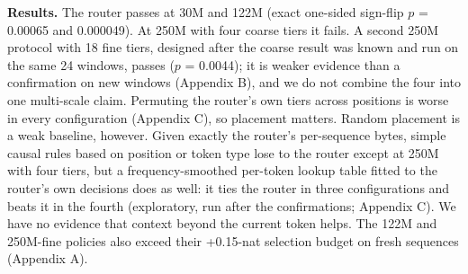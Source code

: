 \documentclass[11pt]{article}
\begin{document}
\begin{table}[t]
\centering
\caption{Pre-registered fresh-window confirmations of the router against exact-byte random placement, 24 sequences per configuration. Wins count sequences on which the router has the lower loss.}
\end{table}

\textbf{Results.} The router passes at 30M and 122M (exact one-sided sign-flip $p$ = 0.00065 and 0.000049). At 250M with four coarse tiers it fails. A second 250M protocol with 18 fine tiers, designed after the coarse result was known and run on the same 24 windows, passes ($p$ = 0.0044); it is weaker evidence than a confirmation on new windows (Appendix B), and we do not combine the four into one multi-scale claim. Permuting the router's own tiers across positions is worse in every configuration (Appendix C), so placement matters. Random placement is a weak baseline, however. Given exactly the router's per-sequence bytes, simple causal rules based on position or token type lose to the router except at 250M with four tiers, but a frequency-smoothed per-token lookup table fitted to the router's own decisions does as well: it ties the router in three configurations and beats it in the fourth (exploratory, run after the confirmations; Appendix C). We have no evidence that context beyond the current token helps. The 122M and 250M-fine policies also exceed their +0.15-nat selection budget on fresh sequences (Appendix A).
\end{document}
